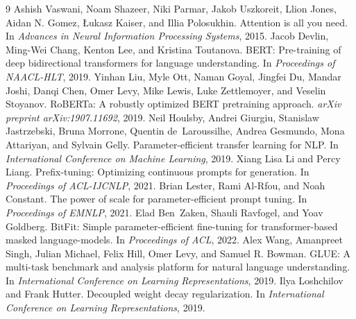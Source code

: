 \documentclass[10pt]{article}
\begin{document}
\begin{thebibliography}{9}
 Ashish Vaswani, Noam Shazeer, Niki Parmar, Jakob Uszkoreit, Llion Jones, Aidan N. Gomez, {\L}ukasz Kaiser, and Illia Polosukhin. Attention is all you need. In \emph{Advances in Neural Information Processing Systems}, 2015.
 Jacob Devlin, Ming-Wei Chang, Kenton Lee, and Kristina Toutanova. BERT: Pre-training of deep bidirectional transformers for language understanding. In \emph{Proceedings of NAACL-HLT}, 2019.
 Yinhan Liu, Myle Ott, Naman Goyal, Jingfei Du, Mandar Joshi, Danqi Chen, Omer Levy, Mike Lewis, Luke Zettlemoyer, and Veselin Stoyanov. RoBERTa: A robustly optimized BERT pretraining approach. \emph{arXiv preprint arXiv:1907.11692}, 2019.
 Neil Houlsby, Andrei Giurgiu, Stanislaw Jastrzebski, Bruna Morrone, Quentin de~Laroussilhe, Andrea Gesmundo, Mona Attariyan, and Sylvain Gelly. Parameter-efficient transfer learning for NLP. In \emph{International Conference on Machine Learning}, 2019.
 Xiang Lisa Li and Percy Liang. Prefix-tuning: Optimizing continuous prompts for generation. In \emph{Proceedings of ACL-IJCNLP}, 2021.
 Brian Lester, Rami Al-Rfou, and Noah Constant. The power of scale for parameter-efficient prompt tuning. In \emph{Proceedings of EMNLP}, 2021.
 Elad Ben~Zaken, Shauli Ravfogel, and Yoav Goldberg. BitFit: Simple parameter-efficient fine-tuning for transformer-based masked language-models. In \emph{Proceedings of ACL}, 2022.
 Alex Wang, Amanpreet Singh, Julian Michael, Felix Hill, Omer Levy, and Samuel R. Bowman. GLUE: A multi-task benchmark and analysis platform for natural language understanding. In \emph{International Conference on Learning Representations}, 2019.
 Ilya Loshchilov and Frank Hutter. Decoupled weight decay regularization. In \emph{International Conference on Learning Representations}, 2019.
\end{thebibliography}
\end{document}
